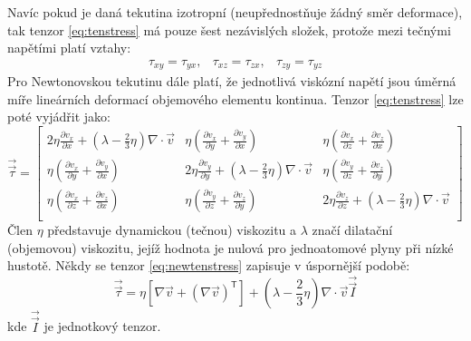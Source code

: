 \noindent  Navíc pokud je daná tekutina izotropní (neupřednostňuje žádný směr deformace), tak tenzor \ref{eq:tenstress} má pouze šest nezávislých složek, protože mezi tečnými napětími platí vztahy:
\begin{equation}
    \begin{array}{ccc}
      \tau_{xy} = \tau_{yx}, & \tau_{xz} = \tau_{zx}, & \tau_{zy} = \tau_{yz}
      \end{array}
  	\label{eq:dept}
\end{equation} 
Pro Newtonovskou tekutinu dále platí, že jednotlivá viskózní napětí jsou úměrná míře lineárních deformací objemového elementu kontinua. Tenzor \ref{eq:tenstress} lze poté vyjádřit jako: 
\begin{equation}
    \vec{\vec{\tau}} = 
    \begin{bmatrix}
      2\eta\frac{\partial v_{x}}{\partial x} + \left( \lambda - \frac{2}{3} \eta  \right)  \nabla \cdot \vec{v} & \eta \left( \frac{\partial v_{x}}{\partial y} + \frac{\partial v_{y}}{\partial x} \right) & \eta \left( \frac{\partial v_{x}}{\partial z} + \frac{\partial v_{z}}{\partial x} \right)\\ 
      \eta \left( \frac{\partial v_{x}}{\partial y} + \frac{\partial v_{y}}{\partial x} \right) & 2\eta\frac{\partial v_{y}}{\partial y} + \left( \lambda - \frac{2}{3} \eta  \right)  \nabla \cdot \vec{v} 
      & \eta \left( \frac{\partial v_{y}}{\partial z} + \frac{\partial v_{z}}{\partial y} \right)\\ 
      \eta \left( \frac{\partial v_{x}}{\partial z} + \frac{\partial v_{z}}{\partial x} \right) & \eta \left( \frac{\partial v_{y}}{\partial z} + \frac{\partial v_{z}}{\partial y} \right)
      & 2\eta\frac{\partial v_{z}}{\partial z} + \left( \lambda - \frac{2}{3} \eta  \right) \nabla \cdot \vec{v}\\ 
    \end{bmatrix}
  	\label{eq:newtenstress}
\end{equation} 
Člen $\eta$ představuje dynamickou (tečnou) viskozitu a $\lambda$ značí dilatační (objemovou) viskozitu, jejíž hodnota je nulová pro jednoatomové plyny při nízké hustotě. Někdy se tenzor \ref{eq:newtenstress} zapisuje v úspornější podobě:
\begin{equation}
	\vec{\vec{\tau}} = \eta \left[ \nabla \vec{v} +  \left( \nabla \vec{v} \right)^{\mathsf{T}}\right] +  \left( \lambda -\frac{2}{3} \eta \right) \nabla \cdot \vec{v} \vec{\vec{I}}
	\label{eq:comptenstress}
\end{equation}
kde $\vec{\vec{I}}$ je jednotkový tenzor.

